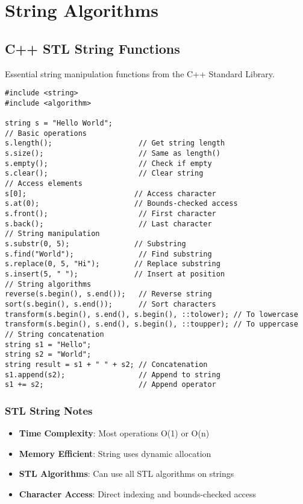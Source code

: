 \documentclass[11pt,a4paper]{article}
\begin{document}
\newpage

\section{String Algorithms}

\subsection{C++ STL String Functions}
Essential string manipulation functions from the C++ Standard Library.

\begin{lstlisting}[caption={STL String Functions}]
#include <string>
#include <algorithm>

string s = "Hello World";
// Basic operations
s.length();                    // Get string length
s.size();                      // Same as length()
s.empty();                     // Check if empty
s.clear();                     // Clear string
// Access elements
s[0];                         // Access character
s.at(0);                      // Bounds-checked access
s.front();                     // First character
s.back();                      // Last character
// String manipulation
s.substr(0, 5);               // Substring
s.find("World");               // Find substring
s.replace(0, 5, "Hi");        // Replace substring
s.insert(5, " ");             // Insert at position
// String algorithms
reverse(s.begin(), s.end());   // Reverse string
sort(s.begin(), s.end());      // Sort characters
transform(s.begin(), s.end(), s.begin(), ::tolower); // To lowercase
transform(s.begin(), s.end(), s.begin(), ::toupper); // To uppercase
// String concatenation
string s1 = "Hello";
string s2 = "World";
string result = s1 + " " + s2; // Concatenation
s1.append(s2);                 // Append to string
s1 += s2;                      // Append operator
\end{lstlisting}

\subsubsection*{STL String Notes}
\begin{itemize}
\item \textbf{Time Complexity}: Most operations O(1) or O(n)
\item \textbf{Memory Efficient}: String uses dynamic allocation
\item \textbf{STL Algorithms}: Can use all STL algorithms on strings
\item \textbf{Character Access}: Direct indexing and bounds-checked access
\end{itemize}
\end{document}
